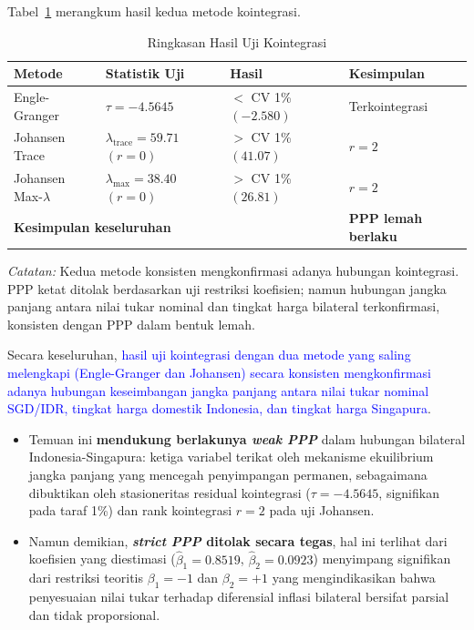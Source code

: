 \documentclass[12pt]{article}
\begin{document}
\newpage
Tabel~\ref{tab:coint_summary} merangkum hasil kedua metode kointegrasi.

\begin{table}[H]
    \centering
    \caption{Ringkasan Hasil Uji Kointegrasi}
    \label{tab:coint_summary}
    \begin{tabular}{llll}
        \toprule
        Metode & Statistik Uji & Hasil & Kesimpulan \\
        \midrule
        Engle-Granger & $\tau = -4.5645$ & $< $ CV 1\% $(-2.580)$ 
            & Terkointegrasi \\
        Johansen Trace & $\lambda_{\text{trace}} = 59.71$ $(r=0)$ 
            & $>$ CV 1\% $(41.07)$ & $r = 2$ \\
        Johansen Max-$\lambda$ & $\lambda_{\text{max}} = 38.40$ $(r=0)$ 
            & $>$ CV 1\% $(26.81)$ & $r = 2$ \\
        \midrule
        \multicolumn{3}{l}{\textbf{Kesimpulan keseluruhan}} 
            & \textbf{PPP lemah berlaku} \\
        \bottomrule
    \end{tabular}
    \begin{tablenotes}
        \small
        \item \textit{Catatan:} Kedua metode konsisten mengkonfirmasi adanya hubungan 
        kointegrasi. PPP ketat ditolak berdasarkan uji restriksi koefisien; namun 
        hubungan jangka panjang antara nilai tukar nominal dan tingkat harga bilateral 
        terkonfirmasi, konsisten dengan PPP dalam bentuk lemah.
    \end{tablenotes}
\end{table}

Secara keseluruhan, \textcolor{blue}{hasil uji kointegrasi dengan dua metode yang saling melengkapi 
(Engle-Granger dan Johansen) secara konsisten mengkonfirmasi adanya hubungan 
keseimbangan jangka panjang antara nilai tukar nominal SGD/IDR, tingkat harga 
domestik Indonesia, dan tingkat harga Singapura}. 
\begin{itemize}
    \item Temuan ini \textbf{mendukung berlakunya 
\textit{weak PPP}} dalam hubungan bilateral Indonesia-Singapura: ketiga variabel 
terikat oleh mekanisme ekuilibrium jangka panjang yang mencegah penyimpangan 
permanen, sebagaimana dibuktikan oleh stasioneritas residual kointegrasi 
($\tau = -4.5645$, signifikan pada taraf 1\%) dan rank kointegrasi $r = 2$ pada 
uji Johansen. 
\item Namun demikian, \textbf{\textit{strict PPP} ditolak secara tegas}, hal ini terlihat dari koefisien 
yang diestimasi ($\hat{\beta}_1 = 0.8519$, $\hat{\beta}_2 = 0.0923$) menyimpang 
signifikan dari restriksi teoritis $\beta_1 = -1$ dan $\beta_2 = +1$ yang 
mengindikasikan bahwa penyesuaian nilai tukar terhadap diferensial inflasi bilateral 
bersifat parsial dan tidak proporsional.
\end{itemize}
 
\end{document}

